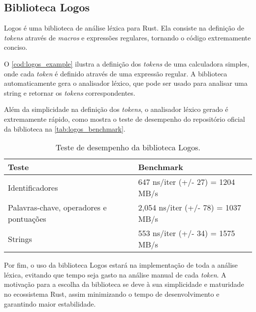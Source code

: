 \subsection{Biblioteca Logos}

Logos é uma biblioteca de análise léxica para Rust. Ela consiste na definição de \textit{tokens} através de \textit{macros} e expressões regulares, tornando o código extremamente conciso.

O \autoref{cod:logos_example} ilustra a definição dos \textit{tokens} de uma calculadora simples, onde cada \textit{token} é definido através de uma expressão regular. A biblioteca automaticamente gera o analisador léxico, que pode ser usado para analisar uma string e retornar os \textit{tokens} correspondentes.


\vspace{-1em}

Além da simplicidade na definição dos \textit{tokens}, o analisador léxico gerado é extremamente rápido, como mostra o teste de desempenho do repositório oficial da biblioteca na \autoref{tab:logos_benchmark}.

\begin{table}
	\centering
	\caption{Teste de desempenho da biblioteca Logos.}
	{
		\begin{tabular}{ll}
			\hline
			\textbf{Teste}                          & \textbf{Benchmark}                 \\ \hline
			Identificadores                         & 647 ns/iter (+/- 27) = 1204 MB/s   \\
			Palavras-chave, operadores e pontuações & 2,054 ns/iter (+/- 78) = 1037 MB/s \\
			Strings                                 & 553 ns/iter (+/- 34) = 1575 MB/s   \\ \hline
		\end{tabular}
	}
	\label{tab:logos_benchmark}
\end{table}

Por fim, o uso da biblioteca Logos estará na implementação de toda a análise léxica, evitando que tempo seja gasto na análise manual de cada \textit{token}. A motivação para a escolha da biblioteca se deve à sua simplicidade e maturidade no ecossistema Rust, assim minimizando o tempo de desenvolvimento e garantindo maior estabilidade.

